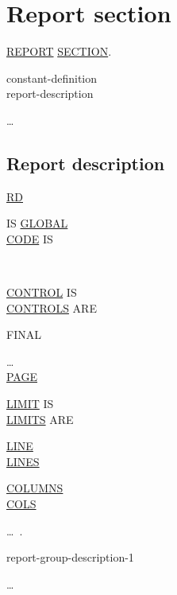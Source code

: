 \documentclass[a4paper,oneside,svgnames]{scrbook}
\makeatletter
\newcommand{\key}[1]{\underline{#1}}
\newcommand{\pending}[1]{%
  \textcolor{gray!75}{#1}}
\newenvironment{0-1}{$\left[ \begin{tabular}{@{}l@{}}}{\end{tabular} \right]$}
\newenvironment{1=}{$\left\{ \begin{tabular}{@{}l@{}}}{\end{tabular} \right\}$}
\makeatother
\begin{document}
\section{Report section}
\pending{
  \key{REPORT} \key{SECTION}.\newline
  \begin{0-1}
    constant-definition \\
    report-description
  \end{0-1}\ldots
}

\subsection{Report description}

\key{RD} \reportname

\begin{0-1}
  IS \key{GLOBAL} \\

  \key{CODE} IS
  \begin{1=}
    \identifier
    \literal
  \end{1=} \\

  \begin{1=}
    \key{CONTROL} IS \\
    \key{CONTROLS} ARE
  \end{1=}
  FINAL
  \begin{1=}
    \identifier
  \end{1=}\ldots \\

  \key{PAGE}
  \begin{0-1}
    \key{LIMIT} IS \\
    \key{LIMITS} ARE
  \end{0-1}
  \integer
  \begin{0-1}
    \key{LINE} \\
    \key{LINES}
  \end{0-1}
  \begin{0-1}
    \integer
    \begin{1=}
      \key{COLUMNS} \\
      \key{COLS}
    \end{1=}
  \end{0-1}
\end{0-1}\ldots\ {}.\newline

\begin{1=}
  report-group-description-1
\end{1=}\ldots
\end{document}
